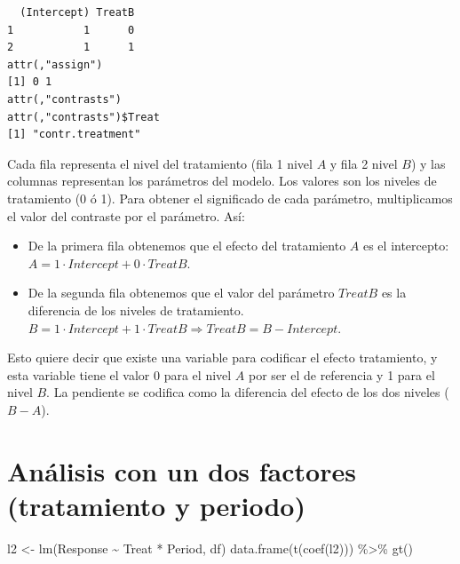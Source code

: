 \documentclass[
  12pt,
  a4paper,
  extrafontsizes,
  onecolumn,
  openright,
  table]{memoir}
\newenvironment{Shaded}{\begin{snugshade}}{\end{snugshade}}
\newcommand{\FunctionTok}[1]{\textcolor[rgb]{0.28,0.35,0.67}{#1}}
\newcommand{\NormalTok}[1]{\textcolor[rgb]{0.00,0.23,0.31}{#1}}
\newcommand{\OtherTok}[1]{\textcolor[rgb]{0.00,0.23,0.31}{#1}}
\newcommand{\SpecialCharTok}[1]{\textcolor[rgb]{0.37,0.37,0.37}{#1}}
\providecommand{\tightlist}{%
  \setlength{\itemsep}{0pt}\setlength{\parskip}{0pt}}\usepackage{longtable,booktabs,array}
\begin{document}
\begin{verbatim}
  (Intercept) TreatB
1           1      0
2           1      1
attr(,"assign")
[1] 0 1
attr(,"contrasts")
attr(,"contrasts")$Treat
[1] "contr.treatment"
\end{verbatim}

\normalsize

Cada fila representa el nivel del tratamiento (fila 1 nivel \(A\) y fila
2 nivel \(B\)) y las columnas representan los parámetros del modelo. Los
valores son los niveles de tratamiento (0 ó 1). Para obtener el
significado de cada parámetro, multiplicamos el valor del contraste por
el parámetro. Así:

\begin{itemize}
\tightlist
\item
  De la primera fila obtenemos que el efecto del tratamiento \(A\) es el
  intercepto: \(A = 1 \cdot Intercept + 0 \cdot TreatB\).
\item
  De la segunda fila obtenemos que el valor del parámetro \(TreatB\) es
  la diferencia de los niveles de tratamiento.
  \(B = 1 \cdot Intercept + 1 \cdot TreatB \Rightarrow TreatB = B - Intercept\).
\end{itemize}

Esto quiere decir que existe una variable para codificar el efecto
tratamiento, y esta variable tiene el valor 0 para el nivel \(A\) por
ser el de referencia y 1 para el nivel \(B\). La pendiente se codifica
como la diferencia del efecto de los dos niveles (\(B - A\)).

\hypertarget{anuxe1lisis-con-un-dos-factores-tratamiento-y-periodo}{%
\section{Análisis con un dos factores (tratamiento y
periodo)}\label{anuxe1lisis-con-un-dos-factores-tratamiento-y-periodo}}

\scriptsize

\begin{Shaded}
\begin{Highlighting}[]
\NormalTok{l2 }\OtherTok{\textless{}{-}} \FunctionTok{lm}\NormalTok{(Response }\SpecialCharTok{\textasciitilde{}}\NormalTok{ Treat }\SpecialCharTok{*}\NormalTok{ Period, df)}
\FunctionTok{data.frame}\NormalTok{(}\FunctionTok{t}\NormalTok{(}\FunctionTok{coef}\NormalTok{(l2))) }\SpecialCharTok{\%\textgreater{}\%} \FunctionTok{gt}\NormalTok{()}
\end{Highlighting}
\end{Shaded}
\end{document}
